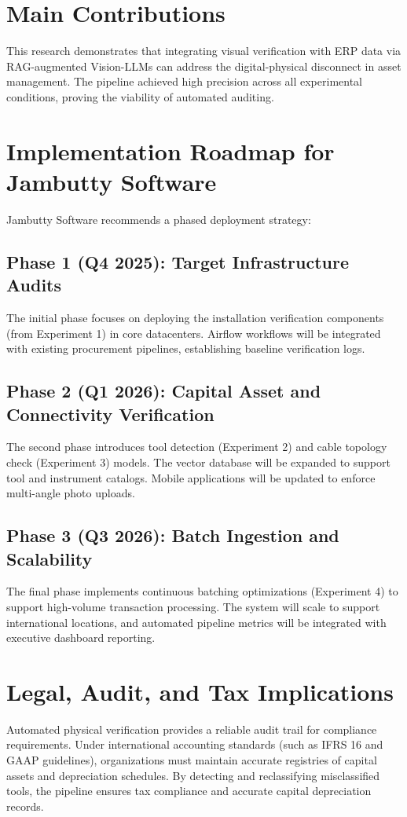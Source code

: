 \documentclass[11pt,letterpaper]{report}
\begin{document}
\section{Main Contributions}
This research demonstrates that integrating visual verification with ERP data via RAG-augmented Vision-LLMs can address the digital-physical disconnect in asset management. The pipeline achieved high precision across all experimental conditions, proving the viability of automated auditing.

\section{Implementation Roadmap for Jambutty Software}
Jambutty Software recommends a phased deployment strategy:

\subsection{Phase 1 (Q4 2025): Target Infrastructure Audits}
The initial phase focuses on deploying the installation verification components (from Experiment 1) in core datacenters. Airflow workflows will be integrated with existing procurement pipelines, establishing baseline verification logs.

\subsection{Phase 2 (Q1 2026): Capital Asset and Connectivity Verification}
The second phase introduces tool detection (Experiment 2) and cable topology check (Experiment 3) models. The vector database will be expanded to support tool and instrument catalogs. Mobile applications will be updated to enforce multi-angle photo uploads.

\subsection{Phase 3 (Q3 2026): Batch Ingestion and Scalability}
The final phase implements continuous batching optimizations (Experiment 4) to support high-volume transaction processing. The system will scale to support international locations, and automated pipeline metrics will be integrated with executive dashboard reporting.

\section{Legal, Audit, and Tax Implications}
Automated physical verification provides a reliable audit trail for compliance requirements. Under international accounting standards (such as IFRS 16 and GAAP guidelines), organizations must maintain accurate registries of capital assets and depreciation schedules. By detecting and reclassifying misclassified tools, the pipeline ensures tax compliance and accurate capital depreciation records.
\end{document}
